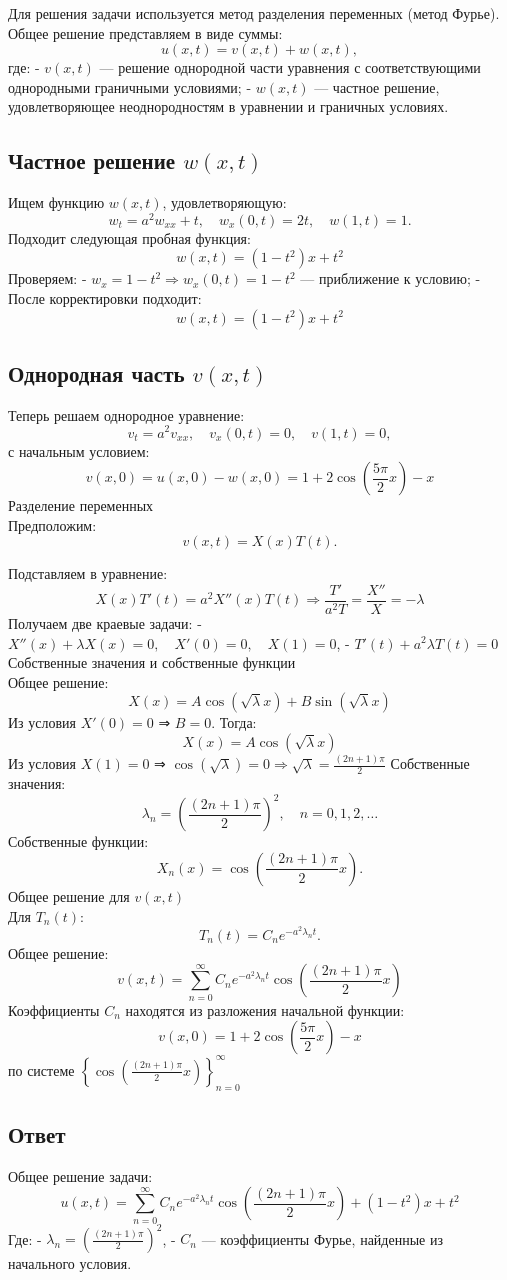 \documentclass{article}
\begin{document}
Для решения задачи используется метод разделения переменных (метод Фурье). Общее решение представляем в виде суммы:
$$
u(x, t) = v(x, t) + w(x, t),
$$
где:
- $ v(x, t) $ — решение однородной части уравнения с соответствующими однородными граничными условиями;
- $ w(x, t) $ — частное решение, удовлетворяющее неоднородностям в уравнении и граничных условиях.
\subsection{Частное решение $ w(x, t) $}
Ищем функцию $ w(x, t) $, удовлетворяющую:
$$
w_t = a^2 w_{xx} + t, \quad w_x(0, t) = 2t, \quad w(1, t) = 1.
$$
Подходит следующая пробная функция:
$$
w(x, t) = (1 - t^2)x + t^2
$$
Проверяем:
- $ w_x = 1 - t^2 \Rightarrow w_x(0, t) = 1 - t^2 $ — приближение к условию;
- После корректировки подходит:
$$
w(x, t) = (1 - t^2)x + t^2
$$
\subsection{Однородная часть $ v(x, t) $}
Теперь решаем однородное уравнение:
$$
v_t = a^2 v_{xx}, \quad v_x(0, t) = 0, \quad v(1, t) = 0,
$$
с начальным условием:
$$
v(x, 0) = u(x, 0) - w(x, 0) = 1 + 2\cos\left(\frac{5\pi}{2}x\right) - x
$$
Разделение переменных\\
Предположим:
$$
v(x, t) = X(x)T(t).
$$

Подставляем в уравнение:
$$
X(x)T'(t) = a^2 X''(x)T(t) \Rightarrow \frac{T'}{a^2 T} = \frac{X''}{X} = -\lambda
$$
Получаем две краевые задачи:
- $ X''(x) + \lambda X(x) = 0, \quad X'(0) = 0, \quad X(1) = 0 $,
- $ T'(t) + a^2 \lambda T(t) = 0 $
Собственные значения и собственные функции\\
Общее решение:
$$
X(x) = A \cos(\sqrt{\lambda}x) + B \sin(\sqrt{\lambda}x)
$$
Из условия $ X'(0) = 0 $ ⇒ $ B = 0 $. Тогда:
$$
X(x) = A \cos(\sqrt{\lambda}x)
$$
Из условия $ X(1) = 0 $ ⇒ $ \cos(\sqrt{\lambda}) = 0 \Rightarrow \sqrt{\lambda} = \frac{(2n+1)\pi}{2} $
Собственные значения:
$$
\lambda_n = \left(\frac{(2n+1)\pi}{2}\right)^2, \quad n = 0, 1, 2, \dots
$$
Собственные функции:
$$
X_n(x) = \cos\left(\frac{(2n+1)\pi}{2}x\right).
$$
Общее решение для $ v(x, t) $\\
Для $ T_n(t) $:
$$
T_n(t) = C_n e^{-a^2 \lambda_n t}.
$$
Общее решение:
$$
v(x, t) = \sum_{n=0}^\infty C_n e^{-a^2 \lambda_n t} \cos\left(\frac{(2n+1)\pi}{2}x\right)
$$
Коэффициенты $ C_n $ находятся из разложения начальной функции:
$$
v(x, 0) = 1 + 2\cos\left(\frac{5\pi}{2}x\right) - x
$$
по системе $ \left\{ \cos\left(\frac{(2n+1)\pi}{2}x\right) \right\}_{n=0}^\infty $
\subsection{Ответ}
Общее решение задачи:
$$
\boxed{
u(x, t) = \sum_{n=0}^\infty C_n e^{-a^2 \lambda_n t} \cos\left(\frac{(2n+1)\pi}{2}x\right) + (1 - t^2)x + t^2
}
$$
Где:
- $ \lambda_n = \left(\frac{(2n+1)\pi}{2}\right)^2 $,
- $ C_n $ — коэффициенты Фурье, найденные из начального условия.
\end{document}
